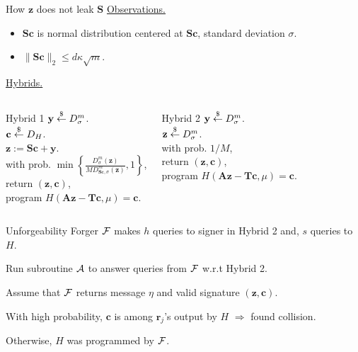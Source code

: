 \begin{frame}{How $\mathbf{z}$ does not leak $\mathbf{S}$}
	\underline{Observations.}
	\begin{itemize}
		\item $\mathbf{S}\mathbf{c}$ is normal distribution centered at $\mathbf{S}\mathbf{c}$, standard deviation $\sigma$.
		\item $\lVert\mathbf{S}\mathbf{c}\rVert_2 \leq d\kappa \sqrt{m}$.
	\end{itemize}
	
	\underline{Hybrids.}
	\begin{columns}[c]
		\begin{expt}{Hybrid 1}
			$\mathbf{y} \stackrel{\$}{\leftarrow} D_\sigma^m$.\\
			$\mathbf{c} \stackrel{\$}{\leftarrow} D_H$.\\
			$\mathbf{z} := \mathbf{S}\mathbf{c} + \mathbf{y}$.\\
			with prob. $\min\left\{\frac{D^m_\sigma(\mathbf{z})}{MD^m_{\mathbf{S}\mathbf{c},\sigma}(\mathbf{z})},1\right\}$,\\
			\qquad return $(\mathbf{z}, \mathbf{c})$, \\
			\qquad program $H(\mathbf{A}\mathbf{z} - \mathbf{T}\mathbf{c}, \mu) = \mathbf{c}$.\\
		\end{expt}
		\begin{expt}{Hybrid 2}
			$\mathbf{y} \stackrel{\$}{\leftarrow} D_\sigma^m$.\\
			$\mathbf{z} \stackrel{\$}{\leftarrow} D_\sigma^m$.\\
			with prob. $1/M$,\\
			\qquad return $(\mathbf{z}, \mathbf{c})$, \\
			\qquad program $H(\mathbf{A}\mathbf{z} - \mathbf{T}\mathbf{c}, \mu) = \mathbf{c}$.\\
		\end{expt}
	\end{columns}
\end{frame}
\begin{frame}{Unforgeability} 
	Forger $\mathcal{F}$ makes $h$ queries to signer in Hybrid 2 and, $s$ queries to $H$. 
	
	Run subroutine $\mathcal{A}$ to answer queries from $\mathcal{F}$ w.r.t Hybrid 2.
	
	Assume that $\mathcal{F}$ returns message $\eta$ and valid signature $(\mathbf{z}, \mathbf{c})$.
	
	With high probability, $\mathbf{c}$ is among $\mathbf{r}_j$'s output by $H$ $\Rightarrow$ found collision. 
	
	Otherwise, $H$ was programmed by $\mathcal{F}$.
\end{frame}